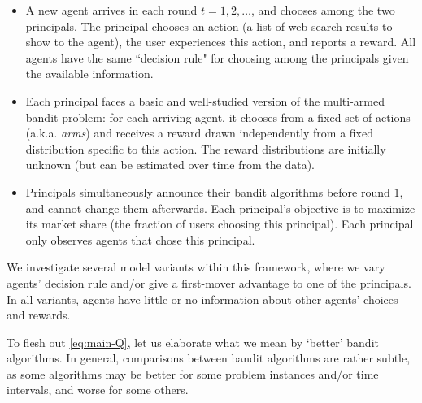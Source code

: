\begin{itemize}

\item A new agent arrives in each round $t=1,2, \ldots$, and chooses among the two principals. The principal chooses an action (\eg a list of web search results to show to the agent), the user experiences this action, and reports a reward. All agents have the same ``decision rule" for choosing among the principals given the available information.

\item Each principal faces a basic and well-studied version of the multi-armed bandit problem: for each arriving agent, it chooses from a fixed set of actions  (a.k.a. \emph{arms}) and receives a reward drawn independently from a fixed distribution specific to this action. The reward distributions are initially unknown (but can be estimated over time from the data).

\item Principals simultaneously announce their bandit algorithms before round $1$, and cannot change them afterwards.  Each principal's objective is to maximize its market share (the fraction of users choosing this principal). Each principal only observes agents that chose this principal.
\end{itemize}

\noindent We investigate several model variants within this framework, where we vary agents' decision rule and/or give a first-mover advantage to one of the principals. In all variants, agents have little or no information about other agents' choices and rewards.


To flesh out \eqref{eq:main-Q}, let us elaborate what we mean by `better' bandit algorithms. In general, comparisons between bandit algorithms are rather subtle, as some algorithms may be better for some problem instances and/or time intervals, and worse for some others.

